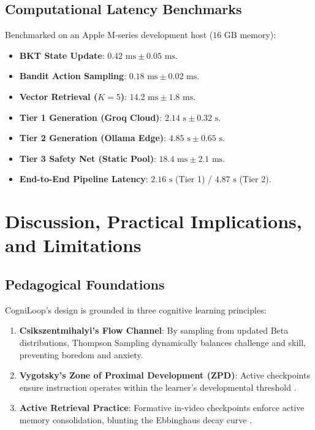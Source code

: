 \documentclass[journal]{IEEEtran}
\begin{document}
\subsection{Computational Latency Benchmarks}
Benchmarked on an Apple M-series development host ($16\text{ GB}$ memory):
\begin{itemize}
    \item \textbf{BKT State Update}: $0.42\text{ ms} \pm 0.05\text{ ms}$.
    \item \textbf{Bandit Action Sampling}: $0.18\text{ ms} \pm 0.02\text{ ms}$.
    \item \textbf{Vector Retrieval ($K=5$)}: $14.2\text{ ms} \pm 1.8\text{ ms}$.
    \item \textbf{Tier 1 Generation (Groq Cloud)}: $2.14\text{ s} \pm 0.32\text{ s}$.
    \item \textbf{Tier 2 Generation (Ollama Edge)}: $4.85\text{ s} \pm 0.65\text{ s}$.
    \item \textbf{Tier 3 Safety Net (Static Pool)}: $18.4\text{ ms} \pm 2.1\text{ ms}$.
    \item \textbf{End-to-End Pipeline Latency}: $2.16\text{ s}$ (Tier 1) / $4.87\text{ s}$ (Tier 2).
\end{itemize}

%
%
\section{Discussion, Practical Implications, and Limitations}

\subsection{Pedagogical Foundations}
CogniLoop's design is grounded in three cognitive learning principles:
\begin{enumerate}
    \item \textbf{Csikszentmihalyi's Flow Channel}: By sampling from updated Beta distributions, Thompson Sampling dynamically balances challenge and skill, preventing boredom and anxiety.
    \item \textbf{Vygotsky's Zone of Proximal Development (ZPD)}: Active checkpoints ensure instruction operates within the learner's developmental threshold \cite{bloom19842}.
    \item \textbf{Active Retrieval Practice}: Formative in-video checkpoints enforce active memory consolidation, blunting the Ebbinghaus decay curve \cite{karpicke2008critical}.
\end{enumerate}
\end{document}

